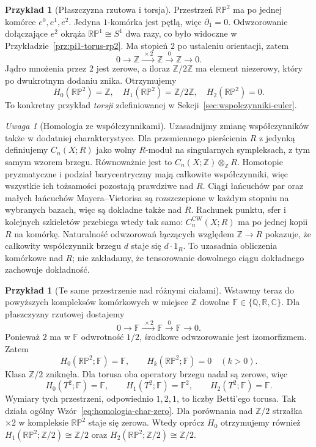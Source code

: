 \documentclass[11pt,a4paper,oneside]{report}
\newcommand{\R}{\mathbb{R}}
\newcommand{\C}{\mathbb{C}}
\newcommand{\Z}{\mathbb{Z}}
\newcommand{\Q}{\mathbb{Q}}
\theoremstyle{plain}
\theoremstyle{definition}
\newtheorem{przyklad}[twierdzenie]{Przykład}
\theoremstyle{remark}
\newtheorem{uwaga}[twierdzenie]{Uwaga}
\begin{document}
\begin{przyklad}[Płaszczyzna rzutowa i torsja]
\label{prz:homologia-rp2}
Przestrzeń $\mathbb{RP}^2$
ma po jednej komórce
$e^0,e^1,e^2$.
Jedyna $1$-komórka jest pętlą,
więc $\partial_1=0$.
Odwzorowanie dołączające $e^2$
okrąża $\mathbb{RP}^1\cong S^1$
dwa razy, co było widoczne
w Przykładzie~\ref{prz:pi1-torus-rp2}.
Ma stopień $2$ po ustaleniu
orientacji, zatem
\[
 0\longrightarrow\Z
 \xrightarrow{\;\times2\;}\Z
 \xrightarrow{\;0\;}\Z
 \longrightarrow0.
\]
Jądro mnożenia przez $2$
jest zerowe, a iloraz
$\Z/2\Z$ ma element
niezerowy, który po
dwukrotnym dodaniu znika.
Otrzymujemy
\[
 H_0(\mathbb{RP}^2)=\Z,\quad
 H_1(\mathbb{RP}^2)=\Z/2\Z,\quad
 H_2(\mathbb{RP}^2)=0.
\]
To konkretny przykład \emph{torsji}
zdefiniowanej w
Sekcji~\ref{sec:wspolczynniki-euler}.
\end{przyklad}

\begin{uwaga}[Homologia ze współczynnikami]
\label{rem:homologia-wspolczynniki-przestrzeni}
Uzasadnijmy zmianę współczynników także w dodatniej charakterystyce.
Dla przemiennego pierścienia $R$ z jedynką definiujemy $C_n(X;R)$
jako wolny $R$-moduł na singularnych sympleksach, z tym samym wzorem brzegu.
Równoważnie jest to $C_n(X;\Z)\otimes_{\Z}R$.
Homotopie pryzmatyczne i podział barycentryczny mają całkowite współczynniki,
więc wszystkie ich tożsamości pozostają prawdziwe nad $R$.
Ciągi łańcuchów par oraz małych łańcuchów Mayera--Vietorisa są
rozszczepione w każdym stopniu na wybranych bazach, więc są dokładne także nad $R$.
Rachunek punktu, sfer i kolejnych szkieletów przebiega wtedy tak samo:
$C_n^{\mathrm{CW}}(X;R)$ ma po jednej kopii $R$ na komórkę.
Naturalność odwzorowań łączących względem $\Z\to R$ pokazuje,
że całkowity współczynnik brzegu $d$ staje się $d\cdot1_R$.
To uzasadnia obliczenia komórkowe nad $R$; nie zakładamy,
że tensorowanie dowolnego ciągu dokładnego zachowuje dokładność.
\end{uwaga}

\begin{przyklad}[Te same przestrzenie nad różnymi ciałami]
\label{prz:zmiana-wspolczynnikow-rp2-torus}
Wstawmy teraz do powyższych kompleksów komórkowych
w miejsce $\Z$ dowolne
$\mathbb F\in\{\Q,\R,\C\}$.
Dla płaszczyzny rzutowej dostajemy
\[
 0\longrightarrow\mathbb F
 \xrightarrow{\;\times2\;}\mathbb F
 \xrightarrow{\;0\;}\mathbb F
 \longrightarrow0.
\]
Ponieważ $2$ ma w $\mathbb F$ odwrotność
$1/2$, środkowe odwzorowanie jest
izomorfizmem. Zatem
\[
 H_0(\mathbb{RP}^2;\mathbb F)=\mathbb F,
 \qquad H_k(\mathbb{RP}^2;\mathbb F)=0\quad(k>0).
\]
Klasa $\Z/2$ zniknęła. Dla torusa oba
operatory brzegu nadal są zerowe, więc
\[
 H_0(T^2;\mathbb F)=\mathbb F,\qquad
 H_1(T^2;\mathbb F)=\mathbb F^2,\qquad
 H_2(T^2;\mathbb F)=\mathbb F.
\]
Wymiary tych przestrzeni, odpowiednio
$1,2,1$, to liczby Betti'ego torusa.
Tak działa ogólny
Wzór~\eqref{eq:homologia-char-zero}.
Dla porównania nad $\Z/2$ strzałka
$\times2$ w kompleksie $\mathbb{RP}^2$
staje się zerowa. Wtedy oprócz $H_0$
otrzymujemy również
$H_1(\mathbb{RP}^2;\Z/2)\cong\Z/2$
oraz $H_2(\mathbb{RP}^2;\Z/2)\cong\Z/2$.
\end{przyklad}
\end{document}

